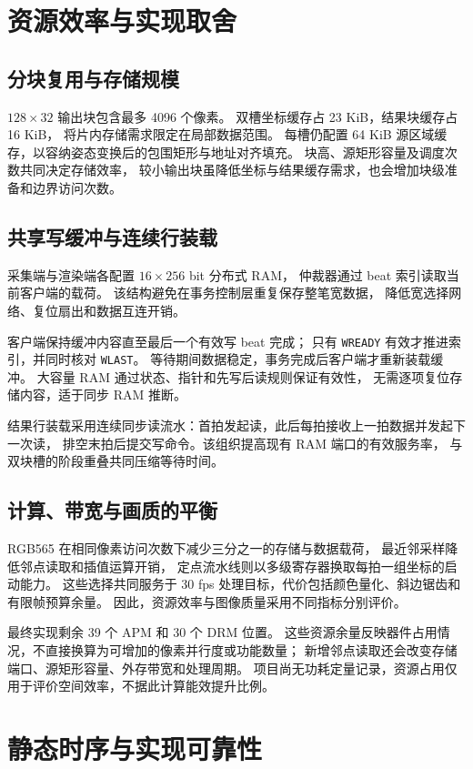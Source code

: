 \section{资源效率与实现取舍}
\subsection{分块复用与存储规模}
$128\times32$ 输出块包含最多 4096 个像素。
双槽坐标缓存占 23 KiB，结果块缓存占 16 KiB，
将片内存储需求限定在局部数据范围。
每槽仍配置 64 KiB 源区域缓存，以容纳姿态变换后的包围矩形与地址对齐填充。
块高、源矩形容量及调度次数共同决定存储效率，
较小输出块虽降低坐标与结果缓存需求，也会增加块级准备和边界访问次数。

\subsection{共享写缓冲与连续行装载}
采集端与渲染端各配置 $16\times256$ bit 分布式 RAM，
仲裁器通过 beat 索引读取当前客户端的载荷。
该结构避免在事务控制层重复保存整笔宽数据，
降低宽选择网络、复位扇出和数据互连开销。

客户端保持缓冲内容直至最后一个有效写 beat 完成；
只有 \texttt{WREADY} 有效才推进索引，并同时核对 \texttt{WLAST}。
等待期间数据稳定，事务完成后客户端才重新装载缓冲。
大容量 RAM 通过状态、指针和先写后读规则保证有效性，
无需逐项复位存储内容，适于同步 RAM 推断。

结果行装载采用连续同步读流水：首拍发起读，此后每拍接收上一拍数据并发起下一次读，
排空末拍后提交写命令。该组织提高现有 RAM 端口的有效服务率，
与双块槽的阶段重叠共同压缩等待时间。

\subsection{计算、带宽与画质的平衡}
RGB565 在相同像素访问次数下减少三分之一的存储与数据载荷，
最近邻采样降低邻点读取和插值运算开销，
定点流水线则以多级寄存器换取每拍一组坐标的启动能力。
这些选择共同服务于 30 fps 处理目标，代价包括颜色量化、斜边锯齿和有限帧预算余量。
因此，资源效率与图像质量采用不同指标分别评价。

最终实现剩余 39 个 APM 和 30 个 DRM 位置。
这些资源余量反映器件占用情况，不直接换算为可增加的像素并行度或功能数量；
新增邻点读取还会改变存储端口、源矩形容量、外存带宽和处理周期。
项目尚无功耗定量记录，资源占用仅用于评价空间效率，不据此计算能效提升比例。

\section{静态时序与实现可靠性}
